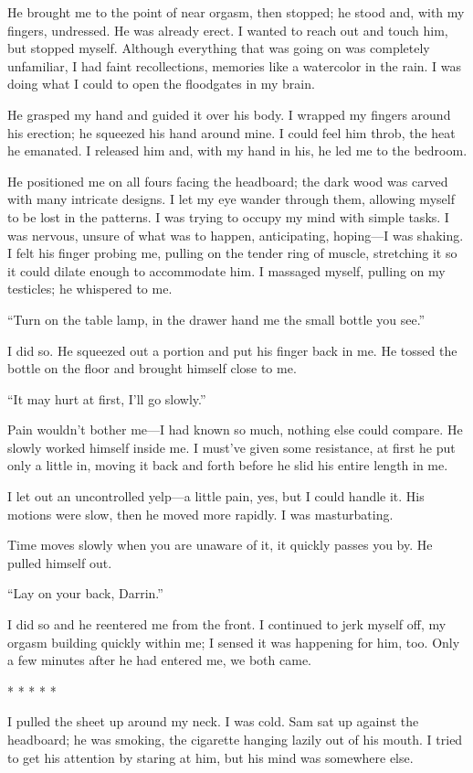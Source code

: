 \documentclass[
]{article}
\begin{document}
He brought me to the point of near orgasm, then stopped; he stood and,
with my fingers, undressed. He was already erect. I wanted to reach out
and touch him, but stopped myself. Although everything that was going on
was completely unfamiliar, I had faint recollections, memories like a
watercolor in the rain. I was doing what I could to open the floodgates
in my brain.

He grasped my hand and guided it over his body. I wrapped my fingers
around his erection; he squeezed his hand around mine. I could feel him
throb, the heat he emanated. I released him and, with my hand in his, he
led me to the bedroom.

He positioned me on all fours facing the headboard; the dark wood was
carved with many intricate designs. I let my eye wander through them,
allowing myself to be lost in the patterns. I was trying to occupy my
mind with simple tasks. I was nervous, unsure of what was to happen,
anticipating, hoping---I was shaking. I felt his finger probing me,
pulling on the tender ring of muscle, stretching it so it could dilate
enough to accommodate him. I massaged myself, pulling on my testicles;
he whispered to me.

``Turn on the table lamp, in the drawer hand me the small bottle you
see.''

I did so. He squeezed out a portion and put his finger back in me. He
tossed the bottle on the floor and brought himself close to me.

``It may hurt at first, I'll go slowly.''

Pain wouldn't bother me---I had known so much, nothing else could
compare. He slowly worked himself inside me. I must've given some
resistance, at first he put only a little in, moving it back and forth
before he slid his entire length in me.

I let out an uncontrolled yelp---a little pain, yes, but I could handle
it. His motions were slow, then he moved more rapidly. I was
masturbating.

Time moves slowly when you are unaware of it, it quickly passes you by.
He pulled himself out.

``Lay on your back, Darrin.''

I did so and he reentered me from the front. I continued to jerk myself
off, my orgasm building quickly within me; I sensed it was happening for
him, too. Only a few minutes after he had entered me, we both came.

* * * * *

I pulled the sheet up around my neck. I was cold. Sam sat up against the
headboard; he was smoking, the cigarette hanging lazily out of his
mouth. I tried to get his attention by staring at him, but his mind was
somewhere else.
\end{document}

